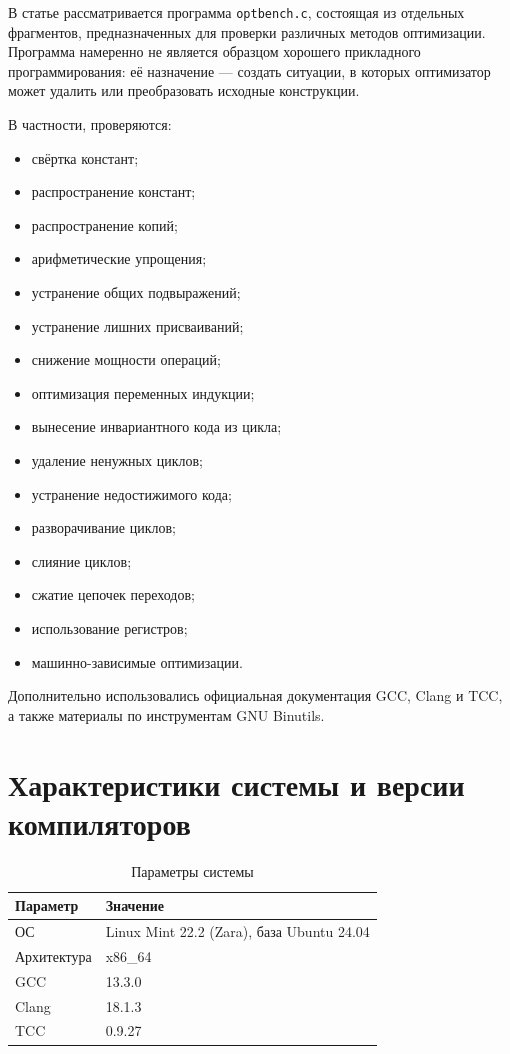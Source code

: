 \documentclass[12pt,a4paper]{article}
\begin{document}
В статье рассматривается программа \texttt{optbench.c}, состоящая из отдельных фрагментов, предназначенных для проверки различных методов оптимизации. Программа намеренно не является образцом хорошего прикладного программирования: её назначение --- создать ситуации, в которых оптимизатор может удалить или преобразовать исходные конструкции.

В частности, проверяются:
\begin{itemize}
    \item свёртка констант;
    \item распространение констант;
    \item распространение копий;
    \item арифметические упрощения;
    \item устранение общих подвыражений;
    \item устранение лишних присваиваний;
    \item снижение мощности операций;
    \item оптимизация переменных индукции;
    \item вынесение инвариантного кода из цикла;
    \item удаление ненужных циклов;
    \item устранение недостижимого кода;
    \item разворачивание циклов;
    \item слияние циклов;
    \item сжатие цепочек переходов;
    \item использование регистров;
    \item машинно-зависимые оптимизации.
\end{itemize}

Дополнительно использовались официальная документация GCC, Clang и TCC, а также материалы по инструментам GNU Binutils.

\section{Характеристики системы и версии компиляторов}

\begin{table}[H]
\centering
\caption{Параметры системы}
\begin{tabular}{ll}
\toprule
Параметр & Значение \\
\midrule
ОС & Linux Mint 22.2 (Zara), база Ubuntu 24.04 \\
Архитектура & x86\_64 \\
GCC & 13.3.0 \\
Clang & 18.1.3 \\
TCC & 0.9.27 \\
\bottomrule
\end{tabular}
\end{table}
\end{document}
